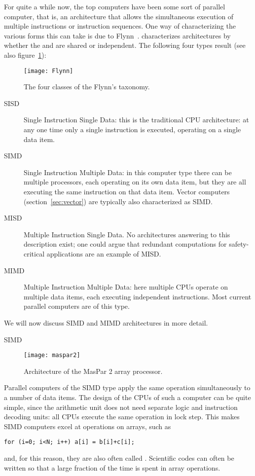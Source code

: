 For quite a while now, the top computers have been
some sort of parallel computer, that is, an architecture that allows
the simultaneous execution of multiple instructions or instruction
sequences. One way of characterizing the various forms this can take
is due to Flynn~\cite{flynn:taxonomy}.  
characterizes architectures by whether the 
and  are shared or independent.
The following four types result (see also figure~\ref{fig:flynn}):
\begin{figure}[t]
  \texttt{[image: Flynn]}
  \caption{The four classes of the Flynn's taxonomy.}
  \label{fig:flynn}
\end{figure}
\begin{description}
\item[SISD] Single Instruction Single Data: this is the traditional
  CPU architecture: at any one time only a single instruction is
  executed, operating on a single data item.
\item[SIMD] Single Instruction Multiple Data: in this computer type
  there can be multiple processors, each operating on its own data
  item, but they are all executing the same instruction on that data
  item. Vector computers (section~\ref{sec:vector}) are typically also
  characterized as SIMD.
\item[MISD] Multiple Instruction Single Data. No architectures
  answering to this description exist; one could argue that
  redundant computations for safety-critical applications are an
  example of MISD.
\item[MIMD] Multiple Instruction Multiple Data: here multiple CPUs
  operate on multiple data items, each executing independent
  instructions. Most current parallel computers are of this
  type.
\end{description}

We will now discuss SIMD and MIMD architectures in more detail.

\begin{lulu}
  \newpage
\end{lulu}

 {SIMD}
\label{sec:simd}

\begin{wrapfigure}{r}{2in}
    \texttt{[image: maspar2]}
    \caption{Architecture of the MasPar 2 array processor.}
    \label{fig:maspar}
\end{wrapfigure}
%
Parallel computers of the SIMD type apply the same operation
simultaneously to a number of data items. The design of the CPUs of
such a computer can be quite simple, since the arithmetic unit does
not need separate logic and instruction decoding units: all CPUs
execute the same operation in lock step. 
This makes SIMD computers excel at operations on arrays, such as
%
\begin{verbatim}
for (i=0; i<N; i++) a[i] = b[i]+c[i];
\end{verbatim}
and, for this reason, they are also often called . Scientific codes can often be written so that
a large fraction of the time is spent in array operations.

